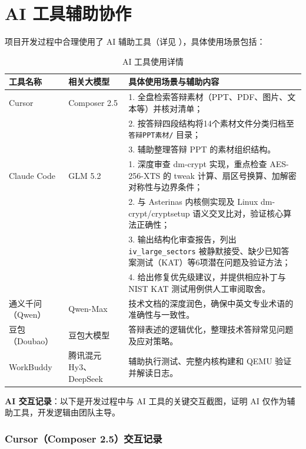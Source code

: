 \section{AI 工具辅助协作}

项目开发过程中合理使用了 AI 辅助工具（详见 \texttt{}），具体使用场景包括：

\begin{table}[H]
    \centering
    \caption{AI 工具使用详情}
    \begin{tabular}{p{}p{}p{}}
        \toprule
        \textbf{工具名称} & \textbf{相关大模型} & \textbf{具体使用场景与辅助内容} \\
        \midrule
        Cursor & Composer 2.5 & 1. 全盘检索答辩素材（PPT、PDF、图片、文本等）并核对清单；\\
         & & 2. 按答辩四段结构将14个素材文件分类归档至 \texttt{答辩PPT素材/} 目录；\\
         & & 3. 辅助整理答辩 PPT 的素材组织结构。\\
        \midrule
        Claude Code & GLM 5.2 & 1. 深度审查 dm-crypt 实现，重点检查 AES-256-XTS 的 tweak 计算、扇区号换算、加解密对称性与边界条件；\\
         & & 2. 与 Asterinas 内核侧实现及 Linux dm-crypt/cryptsetup 语义交叉比对，验证核心算法正确性；\\
         & & 3. 输出结构化审查报告，列出 \texttt{iv\_large\_sectors} 被静默接受、缺少已知答案测试（KAT）等6项潜在问题及验证方法；\\
         & & 4. 给出修复优先级建议，并提供相应补丁与 NIST KAT 测试用例供人工审阅取舍。\\
        \midrule
        通义千问（Qwen） & Qwen-Max & 技术文档的深度润色，确保中英文专业术语的准确性与一致性。 \\
        \midrule
        豆包（Doubao） & 豆包大模型 & 答辩表述的逻辑优化，整理技术答辩常见问题及应对策略。 \\
        \midrule
        WorkBuddy & 腾讯混元 Hy3、DeepSeek & 辅助执行测试、完整内核构建和 QEMU 验证并解读日志。 \\
        \bottomrule
    \end{tabular}
\end{table}

\textbf{AI 交互记录}：以下是开发过程中与 AI 工具的关键交互截图，证明 AI 仅作为辅助工具，开发逻辑由团队主导。

\subsubsection{Cursor（Composer 2.5）交互记录}

